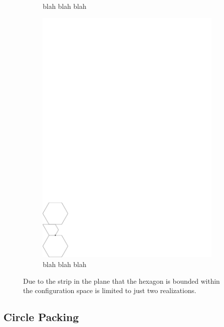 \begin{figure}[h]
\begin{center}
\begin{subfigure}[b]{0.45\textwidth}
	  \caption{blah blah blah}
	  \label{fig:linkage-1-1}
  \end{subfigure}
  \begin{subfigure}[b]{0.45\textwidth}
	  \includegraphics[width=\textwidth]{graphics/LeftSwitchBetweenTwoPolygons.pdf}
	  \caption{blah blah blah}
	  \label{fig:circlePacking1-2}
  \end{subfigure}
\end{center} 
\caption{Due to the strip in the plane that the hexagon is bounded within the configuration space is limited to just two realizations.}\label{fig:circlePacking-1}
\end{figure}
\subsection{Circle Packing}


